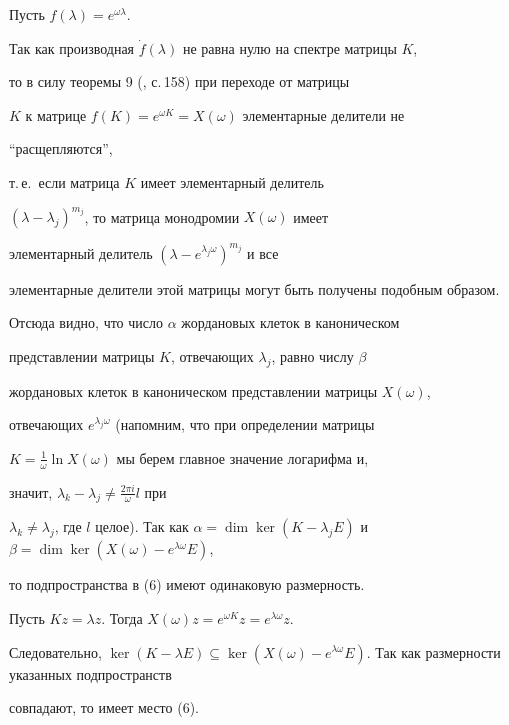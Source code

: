\begin{pf} Пусть $f(\lambda)=e^{\omega\lambda}$.


Так как производная $\Dot f(\lambda)$ не равна нулю на спектре матрицы $K$,


то в силу теоремы 9 (\cite{2}, с.\,158) при переходе от матрицы


$K$ к матрице $f(K)=e^{\omega K}=X(\omega)$ элементарные делители не


``расщепляются'',


т.\,е.~если матрица $K$ имеет элементарный делитель


$(\lambda-\lambda_j)^{m_j}$, то матрица монодромии $X(\omega)$ имеет


элементарный делитель $(\lambda-e^{\lambda_j\omega})^{m_j}$  и все


элементарные делители этой матрицы могут быть получены подобным образом.


Отсюда видно, что число $\alpha$ жордановых клеток в каноническом


представлении матрицы $K$, отвечающих $\lambda_j$, равно числу $\beta$


жордановых клеток в каноническом представлении матрицы $X(\omega)$,


отвечающих $e^{\lambda_j\omega}$ (напомним, что при определении матрицы


$K=\frac{1}{\omega}\ln X(\omega)$ мы берем главное значение логарифма и,


значит, $\lambda_k-\lambda_j\ne\frac{2\pi i}{\omega}l$ при


$\lambda_k\ne\lambda_j$, где $l$ целое). Так как $\alpha=


\dim\ker(K-\lambda_jE)$ и $\beta=\dim\ker(X(\omega)-e^{\lambda\omega}E)$,


то подпространства в (6) имеют одинаковую размерность.





Пусть $Kz=\lambda z$. Тогда $X(\omega)z=e^{\omega K}z=e^{\lambda\omega}z$.


Следовательно, $\ker(K-\lambda E)\subseteq \ker(X(\omega)-


e^{\lambda\omega}E)$. Так как размерности указанных подпространств


совпадают, то имеет место (6).


\end{pf}





